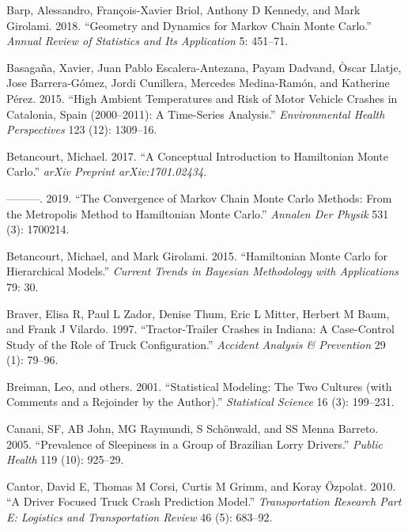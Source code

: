 \documentclass[12pt]{book}
\numberwithin{equation}{chapter}
\begin{document}
\leavevmode\hypertarget{ref-barp2018geometry}{}%
Barp, Alessandro, François-Xavier Briol, Anthony D Kennedy, and Mark Girolami. 2018. ``Geometry and Dynamics for Markov Chain Monte Carlo.'' \emph{Annual Review of Statistics and Its Application} 5: 451--71.

\leavevmode\hypertarget{ref-basagana2015high}{}%
Basagaña, Xavier, Juan Pablo Escalera-Antezana, Payam Dadvand, Òscar Llatje, Jose Barrera-Gómez, Jordi Cunillera, Mercedes Medina-Ramón, and Katherine Pérez. 2015. ``High Ambient Temperatures and Risk of Motor Vehicle Crashes in Catalonia, Spain (2000--2011): A Time-Series Analysis.'' \emph{Environmental Health Perspectives} 123 (12): 1309--16.

\leavevmode\hypertarget{ref-betancourt2017conceptual}{}%
Betancourt, Michael. 2017. ``A Conceptual Introduction to Hamiltonian Monte Carlo.'' \emph{arXiv Preprint arXiv:1701.02434}.

\leavevmode\hypertarget{ref-betancourt2019convergence}{}%
---------. 2019. ``The Convergence of Markov Chain Monte Carlo Methods: From the Metropolis Method to Hamiltonian Monte Carlo.'' \emph{Annalen Der Physik} 531 (3): 1700214.

\leavevmode\hypertarget{ref-betancourt2015hamiltonian}{}%
Betancourt, Michael, and Mark Girolami. 2015. ``Hamiltonian Monte Carlo for Hierarchical Models.'' \emph{Current Trends in Bayesian Methodology with Applications} 79: 30.

\leavevmode\hypertarget{ref-braver1997tractor}{}%
Braver, Elisa R, Paul L Zador, Denise Thum, Eric L Mitter, Herbert M Baum, and Frank J Vilardo. 1997. ``Tractor-Trailer Crashes in Indiana: A Case-Control Study of the Role of Truck Configuration.'' \emph{Accident Analysis \& Prevention} 29 (1): 79--96.

\leavevmode\hypertarget{ref-breiman2001statistical}{}%
Breiman, Leo, and others. 2001. ``Statistical Modeling: The Two Cultures (with Comments and a Rejoinder by the Author).'' \emph{Statistical Science} 16 (3): 199--231.

\leavevmode\hypertarget{ref-canani2005prevalence}{}%
Canani, SF, AB John, MG Raymundi, S Schönwald, and SS Menna Barreto. 2005. ``Prevalence of Sleepiness in a Group of Brazilian Lorry Drivers.'' \emph{Public Health} 119 (10): 925--29.

\leavevmode\hypertarget{ref-cantor2010driver}{}%
Cantor, David E, Thomas M Corsi, Curtis M Grimm, and Koray Özpolat. 2010. ``A Driver Focused Truck Crash Prediction Model.'' \emph{Transportation Research Part E: Logistics and Transportation Review} 46 (5): 683--92.
\end{document}
